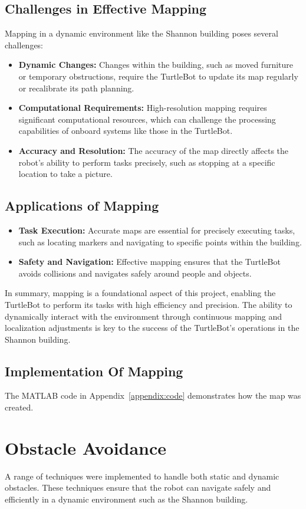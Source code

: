 \documentclass{article}
\begin{document}
	\subsection{Challenges in Effective Mapping}
	Mapping in a dynamic environment like the Shannon building poses several challenges:
	\begin{itemize}
		\item \textbf{Dynamic Changes:} Changes within the building, such as moved furniture or temporary obstructions, require the TurtleBot to update its map regularly or recalibrate its path planning.
		\item \textbf{Computational Requirements:} High-resolution mapping requires significant computational resources, which can challenge the processing capabilities of onboard systems like those in the TurtleBot.
		\item \textbf{Accuracy and Resolution:} The accuracy of the map directly affects the robot's ability to perform tasks precisely, such as stopping at a specific location to take a picture.
	\end{itemize}
	
	\subsection{Applications of Mapping}
	\begin{itemize}
		\item \textbf{Task Execution:} Accurate maps are essential for precisely executing tasks, such as locating markers and navigating to specific points within the building.
		\item \textbf{Safety and Navigation:} Effective mapping ensures that the TurtleBot avoids collisions and navigates safely around people and objects.
	\end{itemize}
	In summary, mapping is a foundational aspect of this project, enabling the TurtleBot to perform its tasks with high efficiency and precision. The ability to dynamically interact with the environment through continuous mapping and localization adjustments is key to the success of the TurtleBot's operations in the Shannon building.
	
	\subsection{Implementation Of Mapping}
	The MATLAB code in Appendix~\ref{appendix:code} demonstrates how the map was created.
	
	\section{Obstacle Avoidance}
	A range of techniques were implemented to handle both static and dynamic obstacles. These techniques ensure that the robot can navigate safely and efficiently in a dynamic environment such as the Shannon building.
	
\end{document}
